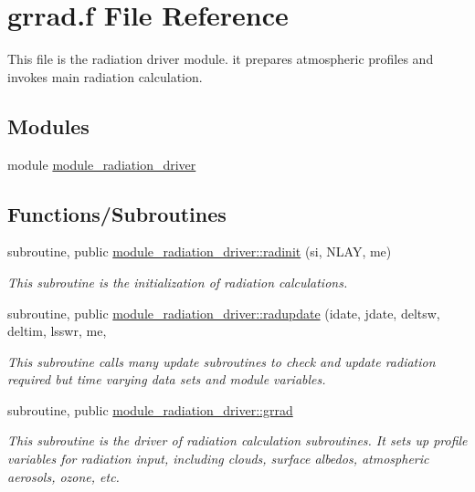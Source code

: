 \hypertarget{grrad_8f}{}\section{grrad.\+f File Reference}
\label{grrad_8f}


This file is the radiation driver module. it prepares atmospheric profiles and invokes main radiation calculation.  


\subsection*{Modules}
\begin{DoxyCompactItemize}
\item 
module \hyperlink{namespacemodule__radiation__driver}{module\+\_\+radiation\+\_\+driver}
\end{DoxyCompactItemize}
\subsection*{Functions/\+Subroutines}
{\bf }\par
\begin{DoxyCompactItemize}
\item 
subroutine, public \hyperlink{group__module__radiation__driver_ga866dcd42f95b3e7df6b448833fe7c33b}{module\+\_\+radiation\+\_\+driver\+::radinit} (si, N\+L\+AY, me)
\begin{DoxyCompactList}\small\item\em This subroutine is the initialization of radiation calculations. \end{DoxyCompactList}\end{DoxyCompactItemize}

{\bf }\par
\begin{DoxyCompactItemize}
\item 
subroutine, public \hyperlink{group__module__radiation__driver_gab34c4eb6e32fd200a6385ae70c5dab12}{module\+\_\+radiation\+\_\+driver\+::radupdate} (idate, jdate, deltsw, deltim, lsswr, me,
\begin{DoxyCompactList}\small\item\em This subroutine calls many update subroutines to check and update radiation required but time varying data sets and module variables. \end{DoxyCompactList}\end{DoxyCompactItemize}

{\bf }\par
\begin{DoxyCompactItemize}
\item 
subroutine, public \hyperlink{group__module__radiation__driver_ga955c841d2ffda6975007d94101b79f7a}{module\+\_\+radiation\+\_\+driver\+::grrad}
\begin{DoxyCompactList}\small\item\em This subroutine is the driver of radiation calculation subroutines. It sets up profile variables for radiation input, including clouds, surface albedos, atmospheric aerosols, ozone, etc. \end{DoxyCompactList}\end{DoxyCompactItemize}

